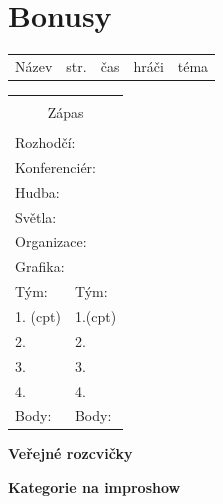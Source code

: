 \documentclass[a4paper,10pt,openany]{book}
\begin{document}
\chapter{Bonusy}
\pagebreak
\newcommand{\btbinfo}[6]{

\ifx Z#6 \textbf{#1} \else #1 \small{  (i)} \fi   & \pageref{#2} &  \small{#3} & \small{#4} & \small{#5}\hline
}
\begin{longtable}{|p{4cm}|p{.4cm}|p{3.2cm}|p{3cm}|p{4.2cm}|}
\hline
Název&str.&čas&hráči&téma \hline


\end{longtable}
\pagebreak
\renewcommand{\btbinfo}[6]{
\ifx Z#6 #1   \fi

}
\begin{multicols}{3}
 \begin{tabular}[t]{|p{25mm}|p{25mm}    |}
 \hline
 \multicolumn{2}{|c|}{ } \\
 \multicolumn{2}{|c|}{\large{Zápas}} \\
 \multicolumn{2}{|c|}{ } \\
\hline
\multicolumn{2}{|l|}{ Rozhodčí: }   \\ \hline
\multicolumn{2}{|l|}{ Konferenciér: }   \\ \hline
\multicolumn{2}{|l|}{ Hudba: }   \\ \hline
\multicolumn{2}{|l|}{ Světla: }   \\ \hline
\multicolumn{2}{|l|}{ Organizace: }   \\ \hline
\multicolumn{2}{|l|}{ Grafika: }   \\ \hline
Tým: &  Tým:\\ \hline
1. \small{(cpt)}  & 1.\small{(cpt)} \\ \hline
2.  & 2. \\ \hline
3. & 3. \\ \hline
4.  & 4. \\ \hline
Body:  & Body: \\ \hline

\end{tabular}
\vspace{3mm}

\end {multicols}
\renewcommand{\btbinfo}[6]{
\ifx Z#6  \else
\large{#1 }

  \fi
}
\hline

\begin{multicols}{3}
\large{\textbf{Veřejné rozcvičky}}


\end {multicols}
\hline

\begin{multicols}{3}
\large{\textbf{Kategorie na improshow}}


\end {multicols}


\pagebreak
\newcommand{\faulinfo}[5]{
#4 & #1 & #3 & #5 \\

}

\begin{tabular}[t]{|p{3cm}|p{4cm}|p{1cm}|p{6cm}    |}

\end{tabular}
\pagebreak
\setcounter{tocdepth}{1}
\tableofcontents
\end{document}
